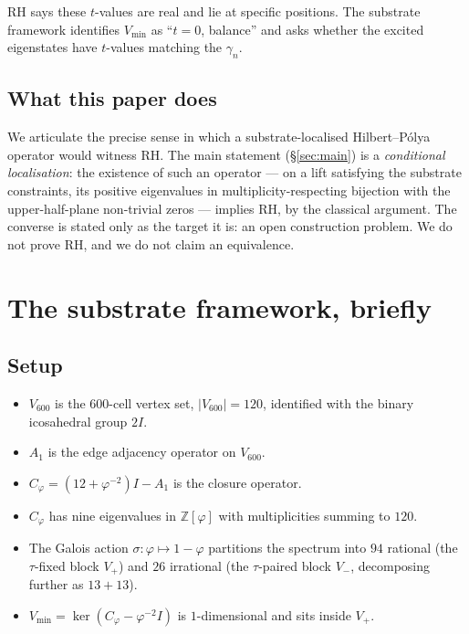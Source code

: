 \documentclass[11pt,a4paper]{article}
\newcommand{\Vsix}{V_{600}}
\newcommand{\Cphi}{C_\varphi}
\newcommand{\Z}{\mathbb{Z}}
\newcommand{\Vmin}{V_{\min}}
\begin{document}
RH says these $t$-values are real and lie at specific positions.
The substrate framework identifies $\Vmin$ as ``$t = 0$, balance''
and asks whether the excited eigenstates have $t$-values matching
the $\gamma_n$.

\subsection{What this paper does}

We articulate the precise sense in which a substrate-localised
Hilbert--P\'olya operator would witness RH. The main statement
(\S\ref{sec:main}) is a \emph{conditional localisation}: the
existence of such an operator --- on a lift satisfying the
substrate constraints, its positive eigenvalues in
multiplicity-respecting bijection with the upper-half-plane
non-trivial zeros --- implies RH, by the classical argument. The
converse is stated only as the target it is: an open construction
problem. We do not prove RH, and we do not claim an equivalence.

\section{The substrate framework, briefly}
\label{sec:framework}

\subsection{Setup}

\begin{itemize}[leftmargin=*]
  \item $\Vsix$ is the $600$-cell vertex set, $|\Vsix| = 120$,
        identified with the binary icosahedral group $2I$.
  \item $A_1$ is the edge adjacency operator on $\Vsix$.
  \item $\Cphi = (12 + \varphi^{-2}) I - A_1$ is the closure
        operator.
  \item $\Cphi$ has nine eigenvalues in $\Z[\varphi]$ with
        multiplicities summing to $120$.
  \item The Galois action $\sigma: \varphi \mapsto 1 - \varphi$
        partitions the spectrum into $94$ rational (the
        $\tau$-fixed block $V_+$) and $26$ irrational (the
        $\tau$-paired block $V_-$, decomposing further as
        $13 + 13$).
  \item $\Vmin = \ker(\Cphi - \varphi^{-2} I)$ is $1$-dimensional
        and sits inside $V_+$.
\end{itemize}
\end{document}
